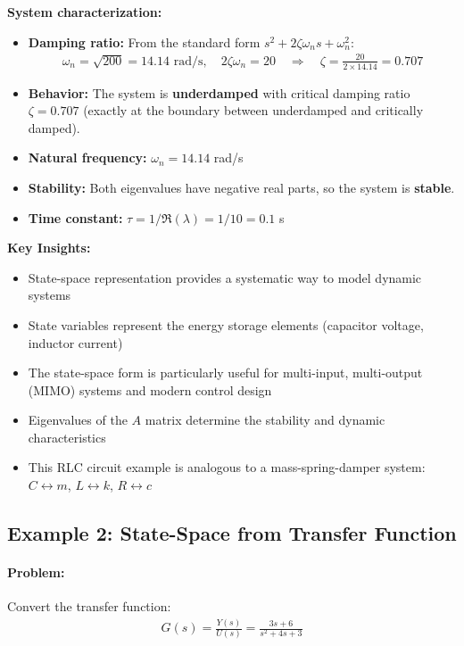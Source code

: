 \documentclass[11pt,a4paper]{article}
\begin{document}
\textbf{System characterization:}
\begin{itemize}
\item \textbf{Damping ratio:} From the standard form $s^2 + 2\zeta\omega_n s + \omega_n^2$:
\begin{align}
\omega_n = \sqrt{200} = 14.14 \text{ rad/s}, \quad 2\zeta\omega_n = 20 \quad \Rightarrow \quad \zeta = \frac{20}{2 \times 14.14} = 0.707
\end{align}
\item \textbf{Behavior:} The system is \textbf{underdamped} with critical damping ratio $\zeta = 0.707$ (exactly at the boundary between underdamped and critically damped).
\item \textbf{Natural frequency:} $\omega_n = 14.14$ rad/s
\item \textbf{Stability:} Both eigenvalues have negative real parts, so the system is \textbf{stable}.
\item \textbf{Time constant:} $\tau = 1/\Re(\lambda) = 1/10 = 0.1$ s
\end{itemize}

\textbf{Key Insights:}
\begin{itemize}
\item State-space representation provides a systematic way to model dynamic systems
\item State variables represent the energy storage elements (capacitor voltage, inductor current)
\item The state-space form is particularly useful for multi-input, multi-output (MIMO) systems and modern control design
\item Eigenvalues of the $A$ matrix determine the stability and dynamic characteristics
\item This RLC circuit example is analogous to a mass-spring-damper system: $C \leftrightarrow m$, $L \leftrightarrow k$, $R \leftrightarrow c$
\end{itemize}

\subsection{Example 2: State-Space from Transfer Function}

\paragraph{Problem:} Convert the transfer function:
\begin{align}
G(s) = \frac{Y(s)}{U(s)} = \frac{3s + 6}{s^2 + 4s + 3}
\end{align}
\end{document}

